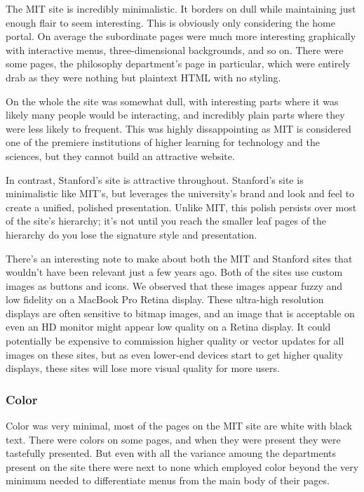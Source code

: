 The MIT site is incredibly minimalistic. It borders on dull while maintaining just enough flair
to seem interesting. This is obviously only considering the home portal. On average the
subordinate pages were much more interesting graphically with interactive menus,
three-dimensional backgrounds, and so on. There were some pages, the philosophy department's
page in particular, which were entirely drab as they were nothing but plaintext HTML with no
styling.

On the whole the site was somewhat dull, with interesting parts where it was likely many
people would be interacting, and incredibly plain parts where they were less likely to
frequent. This was highly dissappointing as MIT is considered one of the premiere
institutions of higher learning for technology and the sciences, but they cannot build an
attractive website.

In contrast, Stanford's site is attractive throughout. Stanford's site is minimalistic
like MIT's, but leverages the university's brand and look and feel to create a unified,
polished presentation. Unlike MIT, this polish persists over most of the site's
hierarchy; it's not until you reach the smaller leaf pages of the hierarchy do you
lose the signature style and presentation.

There's an interesting note to make about both the MIT and Stanford sites that wouldn't
have been relevant just a few years ago. Both of the sites use custom images as buttons
and icons. We observed that these images appear fuzzy and low fidelity on a MacBook
Pro Retina display. These ultra-high resolution displays are often sensitive to
bitmap images, and an image that is acceptable on even an HD monitor might appear
low quality on a Retina display. It could potentially be expensive to commission
higher quality or vector updates for all images on these sites, but as even lower-end
devices start to get higher quality displays, these sites will lose more visual
quality for more users.

\subsubsection*{Color}

Color was very minimal, most of the pages on the MIT site are white with black text. There
were colors on some pages, and when they were present they were tastefully presented. But
even with all the variance amoung the departments present on the site there were next to none
which employed color beyond the very minimum needed to differentiate menus from the main
body of their pages.

